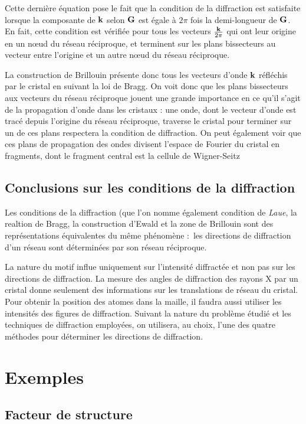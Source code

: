 Cette dernière équation pose le fait que la condition de la diffraction est satisfaite lorsque la composante de $\mathbf{k}$ selon $\mathbf{G}$ est égale à $2\pi$ fois la demi-longueur de $\mathbf{G}$. En fait, cette condition est
vérifiée pour tous les vecteurs $\frac{\mathbf{k}}{2\pi}$ qui ont leur origine en un nœud du réseau réciproque, et terminent sur les plans bissecteurs au vecteur entre l'origine et un autre nœud du réseau réciproque.

La construction de Brillouin présente donc tous les vecteurs d'onde $\mathbf{k}$ réfléchis par le cristal en suivant la loi de Bragg. On voit donc que les plans bissecteurs aux vecteurs du réseau réciproque jouent une grande importance en ce qu'il s'agit de la propagation d'onde dans les cristaux : une onde, dont le vecteur d'onde est tracé depuis l'origine du réseau réciproque, traverse le cristal pour terminer sur un de ces plans respectera la condition de diffraction. On peut également voir que ces plans de propagation des ondes divisent l'espace de Fourier du cristal en fragments, dont le fragment central est la cellule de Wigner-Seitz


\subsection{Conclusions sur les conditions de la diffraction}

Les conditions de la diffraction (que l'on nomme également condition de \emph{Laue}, la realtion de Bragg, la construction d'Ewald et la zone de Brillouin sont des représentations équivalentes du même phénomène : les directions de diffraction d'un réseau sont déterminées par son réseau réciproque.

La nature du motif influe uniquement sur l'intensité diffractée et non pas sur les directions de diffraction. La mesure des angles de diffraction des rayons X par
un cristal donne seulement des informations sur les translations de réseau du cristal. Pour obtenir la position des atomes dans la maille, il faudra aussi utiliser les intensités des figures de diffraction. Suivant la nature du problème étudié et les techniques de diffraction employées, on utilisera, au choix, l'une des quatre méthodes pour déterminer les directions de diffraction.

\section{Exemples}

\subsection{Facteur de structure}

